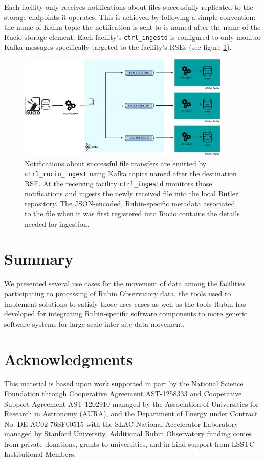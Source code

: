 \documentclass{webofc}
\begin{document}
Each facility only receives notifications about files successfully replicated to the storage endpoints it operates. This is achieved by following a simple convention: the name of Kafka topic the notification is sent to is named after the name of the Rucio storage element. Each facility's \texttt{ctrl\_ingestd} is configured to only monitor Kafka messages specifically targeted to the facility's RSEs (see figure \ref{fig:kafka-control-plane}).

\begin{figure}[h]
\includegraphics[width=0.9\textwidth, center]{images/HermesAndIngestd.png}
\caption{Notifications about successful file transfers are emitted by \texttt{ctrl\_rucio\_ingest} using Kafka topics named after the destination RSE. At the receiving facility \texttt{ctrl\_ingestd} monitors those notifications and ingests the newly received file into the local Butler repository. The JSON-encoded, Rubin-specific metadata associated to the file when it was first registered into Rucio contains the details needed for ingestion.}
\label{fig:kafka-control-plane}
\end{figure}


\section{Summary}
\label{summary}
We presented several use cases for the movement of data among the facilities participating to processing of Rubin Observatory data, the tools used to implement solutions to satisfy those uses cases as well as the tools Rubin has developed for integrating Rubin-specific software components to more generic software systems for large scale inter-site data movement.

\section{Acknowledgments}

This material is based upon work supported in part by the National Science Foundation through Cooperative Agreement AST-1258333 and Cooperative Support Agreement AST-1202910 managed by the Association of Universities for Research in Astronomy (AURA), and the Department of Energy under Contract No. DE-AC02-76SF00515 with the SLAC National Accelerator Laboratory managed by Stanford University. Additional Rubin Observatory funding comes from private donations, grants to universities, and in-kind support from LSSTC Institutional Members.


\end{document}
